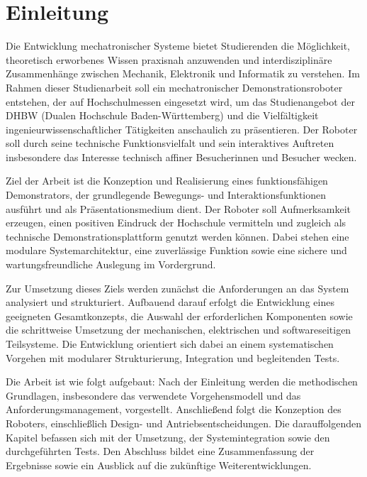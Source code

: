 \chapter{Einleitung}
\label{cha:Einleitung}

Die Entwicklung mechatronischer Systeme bietet Studierenden die Möglichkeit, theoretisch erworbenes Wissen praxisnah anzuwenden und interdisziplinäre Zusammenhänge zwischen Mechanik, Elektronik und Informatik zu verstehen. Im Rahmen dieser Studienarbeit soll ein mechatronischer Demonstrationsroboter entstehen, der auf Hochschulmessen eingesetzt wird, um das Studienangebot der DHBW (Dualen Hochschule Baden-Württemberg) und die Vielfältigkeit ingenieurwissenschaftlicher Tätigkeiten anschaulich zu präsentieren. Der Roboter soll durch seine technische Funktionsvielfalt und sein interaktives Auftreten insbesondere das Interesse technisch affiner Besucherinnen und Besucher wecken.

Ziel der Arbeit ist die Konzeption und Realisierung eines funktionsfähigen Demonstrators, der grundlegende Bewegungs- und Interaktionsfunktionen ausführt und als Präsentationsmedium dient. Der Roboter soll Aufmerksamkeit erzeugen, einen positiven Eindruck der Hochschule vermitteln und zugleich als technische Demonstrationsplattform genutzt werden können. Dabei stehen eine modulare Systemarchitektur, eine zuverlässige Funktion sowie eine sichere und wartungsfreundliche Auslegung im Vordergrund.

Zur Umsetzung dieses Ziels werden zunächst die Anforderungen an das System analysiert und strukturiert. Aufbauend darauf erfolgt die Entwicklung eines geeigneten Gesamtkonzepts, die Auswahl der erforderlichen Komponenten sowie die schrittweise Umsetzung der mechanischen, elektrischen und softwareseitigen Teilsysteme. Die Entwicklung orientiert sich dabei an einem systematischen Vorgehen mit modularer Strukturierung, Integration und begleitenden Tests.

Die Arbeit ist wie folgt aufgebaut: Nach der Einleitung werden die methodischen Grundlagen, insbesondere das verwendete Vorgehensmodell und das Anforderungsmanagement, vorgestellt. Anschließend folgt die Konzeption des Roboters, einschließlich Design- und Antriebsentscheidungen. Die darauffolgenden Kapitel befassen sich mit der Umsetzung, der Systemintegration sowie den durchgeführten Tests. Den Abschluss bildet eine Zusammenfassung der Ergebnisse sowie ein Ausblick auf die zukünftige Weiterentwicklungen.


